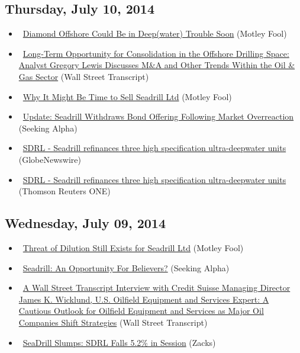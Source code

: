 \documentclass[11pt,asymmetric]{article}
\begin{document}
\subsection*{Thursday, July 10, 2014}
\begin{itemize}
\item\ \href{http://www.fool.com/investing/general/2014/07/10/diamond-offshore-could-be-in-deepwater-trouble-soo.aspx?source=eogyholnk0000001}{Diamond Offshore Could Be in Deep(water) Trouble Soon} (Motley Fool)
\item\ \href{http://finance.yahoo.com/news/long-term-opportunity-consolidation-offshore-173400820.html}{Long-Term Opportunity for Consolidation in the Offshore Drilling Space: Analyst Gregory Lewis Discusses M\&A and Other Trends Within the Oil \& Gas Sector} (Wall Street Transcript)
\item\ \href{http://www.fool.com/investing/general/2014/07/09/why-it-might-be-time-to-sell-seadrill-ltd.aspx?source=eogyholnk0000001}{Why It Might Be Time to Sell Seadrill Ltd} (Motley Fool)
\item\ \href{http://seekingalpha.com/article/2307805-update-seadrill-withdraws-bond-offering-following-market-overreaction?source=yahoo}{Update: Seadrill Withdraws Bond Offering Following Market Overreaction} (Seeking Alpha)
\item\ \href{http://finance.yahoo.com/news/sdrl-seadrill-refinances-three-high-065440043.html}{SDRL - Seadrill refinances three high specification ultra-deepwater units} (GlobeNewswire)
\item\ \href{http://finance.yahoo.com/news/sdrl-seadrill-refinances-three-high-065008599.html}{SDRL - Seadrill refinances three high specification ultra-deepwater units} (Thomson Reuters ONE)
\end{itemize}
\subsection*{Wednesday, July 09, 2014}
\begin{itemize}
\item\ \href{http://www.fool.com/investing/general/2014/07/09/threat-of-dilution-still-exists-for-seadrill-ltd.aspx?source=eogyholnk0000001}{Threat of Dilution Still Exists for Seadrill Ltd} (Motley Fool)
\item\ \href{http://seekingalpha.com/article/2305745-seadrill-an-opportunity-for-believers?source=yahoo}{Seadrill: An Opportunity For Believers?} (Seeking Alpha)
\item\ \href{http://finance.yahoo.com/news/wall-street-transcript-interview-credit-121300659.html}{A Wall Street Transcript Interview with Credit Suisse Managing Director James K. Wicklund, U.S. Oilfield Equipment and Services Expert: A Cautious Outlook for Oilfield Equipment and Services as Major Oil Companies Shift Strategies} (Wall Street Transcript)
\item\ \href{http://finance.yahoo.com/news/seadrill-slumps-sdrl-falls-5-114322912.html}{SeaDrill Slumps: SDRL Falls 5.2\% in Session} (Zacks)
\end{itemize}
\end{document}
